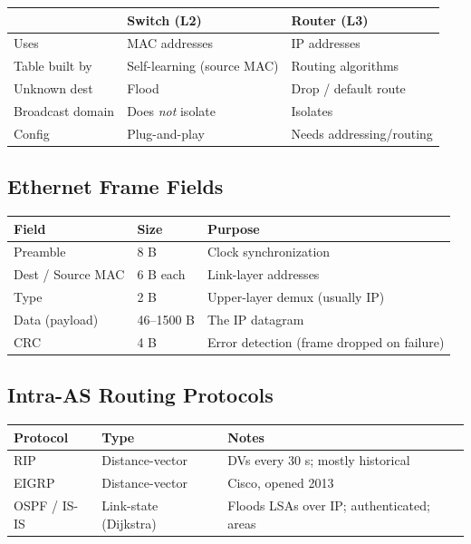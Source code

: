 \documentclass[hidelinks]{article}
\begin{document}
\medskip
\noindent\begin{tabularx}{\textwidth}{|l|X|X|}
\hline
 & \textbf{Switch (L2)} & \textbf{Router (L3)} \\
\hline
Uses & MAC addresses & IP addresses \\
\hline
Table built by & Self-learning (source MAC) & Routing algorithms \\
\hline
Unknown dest & Flood & Drop / default route \\
\hline
Broadcast domain & Does \emph{not} isolate & Isolates \\
\hline
Config & Plug-and-play & Needs addressing/routing \\
\hline
\end{tabularx}

\subsection{Ethernet Frame Fields}

\noindent\begin{tabularx}{\textwidth}{|l|l|X|}
\hline
\textbf{Field} & \textbf{Size} & \textbf{Purpose} \\
\hline
Preamble & 8 B & Clock synchronization \\
\hline
Dest / Source MAC & 6 B each & Link-layer addresses \\
\hline
Type & 2 B & Upper-layer demux (usually IP) \\
\hline
Data (payload) & 46--1500 B & The IP datagram \\
\hline
CRC & 4 B & Error detection (frame dropped on failure) \\
\hline
\end{tabularx}

\subsection{Intra-AS Routing Protocols}

\noindent\begin{tabularx}{\textwidth}{|l|X|X|}
\hline
\textbf{Protocol} & \textbf{Type} & \textbf{Notes} \\
\hline
RIP & Distance-vector & DVs every 30 s; mostly historical \\
\hline
EIGRP & Distance-vector & Cisco, opened 2013 \\
\hline
OSPF / IS-IS & Link-state (Dijkstra) & Floods LSAs over IP; authenticated; areas \\
\hline
\end{tabularx}
\end{document}

